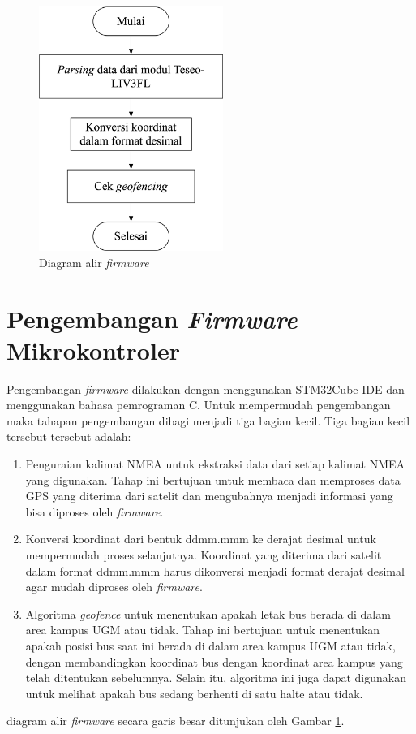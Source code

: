 \begin{figure}[H]
	\centering
	\includegraphics[width=6cm]{contents/chapter-3/firmware-diagram.png}
	\caption{Diagram alir \textit{firmware}}
	\label{Fig: flowchart-firmware}
\end{figure}

\section{Pengembangan \textit{Firmware} Mikrokontroler}
Pengembangan \textit{firmware} dilakukan dengan menggunakan STM32Cube IDE dan menggunakan bahasa pemrograman C. Untuk mempermudah pengembangan maka tahapan pengembangan dibagi menjadi tiga bagian kecil. Tiga bagian kecil tersebut tersebut adalah:
\begin{enumerate}
	\item Penguraian kalimat NMEA untuk ekstraksi data dari setiap kalimat NMEA yang digunakan. Tahap ini bertujuan untuk membaca dan memproses data GPS yang diterima dari satelit dan mengubahnya menjadi informasi yang bisa diproses oleh \textit{firmware}.
	\item Konversi koordinat dari bentuk ddmm.mmm ke derajat desimal untuk mempermudah proses selanjutnya. Koordinat yang diterima dari satelit dalam format ddmm.mmm harus dikonversi menjadi format derajat desimal agar mudah diproses oleh \textit{firmware}.
	\item Algoritma \textit{geofence} untuk menentukan apakah letak bus berada di dalam area kampus UGM atau tidak. Tahap ini bertujuan untuk menentukan apakah posisi bus saat ini berada di dalam area kampus UGM atau tidak, dengan membandingkan koordinat bus dengan koordinat area kampus yang telah ditentukan sebelumnya. Selain itu, algoritma ini juga dapat digunakan untuk melihat apakah bus sedang berhenti di satu halte atau tidak.
\end{enumerate}
diagram alir \textit{firmware} secara garis besar ditunjukan oleh Gambar \ref{Fig: flowchart-firmware}.

